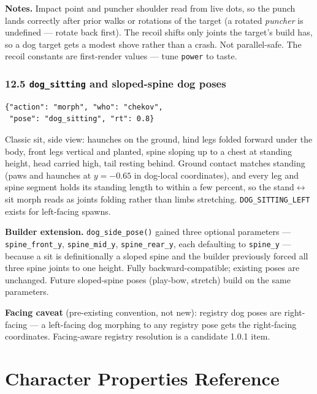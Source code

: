 \documentclass[
  11pt,
]{book}
\begin{document}
\textbf{Notes.} Impact point and puncher shoulder read from live
dots, so the punch lands correctly after prior walks or rotations of
the target (a rotated \emph{puncher} is undefined --- rotate back
first). The recoil shifts only joints the target's build has, so a
dog target gets a modest shove rather than a crash. Not
parallel-safe. The recoil constants are first-render values ---
tune \texttt{power} to taste.

\subsection{\texorpdfstring{12.5 \texttt{dog\_sitting} and sloped-spine
dog poses}{12.5 dog\_sitting and sloped-spine dog poses}}\label{dog-sitting}

\begin{verbatim}
{"action": "morph", "who": "chekov",
 "pose": "dog_sitting", "rt": 0.8}
\end{verbatim}

Classic sit, side view: haunches on the ground, hind legs folded
forward under the body, front legs vertical and planted, spine
sloping up to a chest at standing height, head carried high, tail
resting behind. Ground contact matches standing (paws and haunches
at $y = -0.65$ in dog-local coordinates), and every leg and spine
segment holds its standing length to within a few percent, so the
stand$\leftrightarrow$sit morph reads as joints folding rather than
limbs stretching. \texttt{DOG\_SITTING\_LEFT} exists for left-facing
spawns.

\textbf{Builder extension.} \texttt{dog\_side\_pose()} gained three
optional parameters --- \texttt{spine\_front\_y},
\texttt{spine\_mid\_y}, \texttt{spine\_rear\_y}, each defaulting to
\texttt{spine\_y} --- because a sit is definitionally a sloped spine
and the builder previously forced all three spine joints to one
height. Fully backward-compatible; existing poses are unchanged.
Future sloped-spine poses (play-bow, stretch) build on the same
parameters.

\textbf{Facing caveat} (pre-existing convention, not new): registry
dog poses are right-facing --- a left-facing dog morphing to any
registry pose gets the right-facing coordinates. Facing-aware
registry resolution is a candidate 1.0.1 item.

\chapter{Character Properties
Reference}\label{character-properties-reference}
\end{document}
